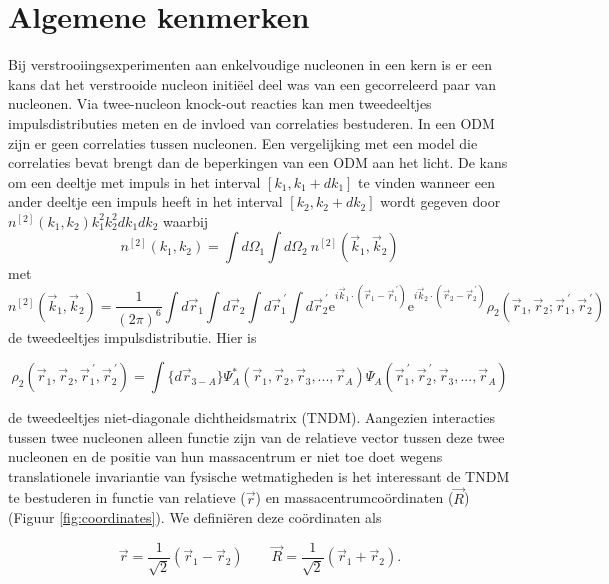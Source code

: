 \documentclass[11pt,twoside]{book}
\begin{document}
\section{Algemene kenmerken}
Bij verstrooiingsexperimenten aan enkelvoudige nucleonen in een kern is er een kans dat het verstrooide nucleon initi\"{e}el deel was van een gecorreleerd paar van nucleonen. Via twee-nucleon knock-out reacties kan men tweedeeltjes impulsdistributies meten \cite{niyazov2004two} en de invloed van correlaties bestuderen. In een ODM zijn er geen correlaties tussen nucleonen. Een vergelijking met een model die correlaties bevat brengt dan de beperkingen van een ODM aan het licht.
De kans om een deeltje met impuls in het interval $[k_1,k_1+dk_1]$ te vinden wanneer een ander deeltje een impuls heeft in het interval $[k_2,k_2+dk_2]$ wordt gegeven door $ n^{[2]}(k_1,k_2)k_1^2k_2^2dk_1dk_2$ waarbij
\begin{equation}
n^{[2]}(k_1,k_2) = \int d\Omega_1 \int d\Omega_2\  n^{[2]}(\vec{k}_1,\vec{k}_2)
\end{equation}
met 
\begin{equation}
n^{[2]}(\vec{k}_1,\vec{k}_2)=\frac{1}{(2\pi)^6}\int d\vec{r}_1 \int d\vec{r}_2 \int  
    						d\vec{r}_1^{\ \prime} \int d\vec{r}_2^{\ \prime} 
    						\mathrm{e}^{i\vec{k}_1\cdot (\vec{r}_1-\vec{r}^{\ \prime}_1)} 
    						\mathrm{e}^{i\vec{k}_2\cdot(\vec{r}_2-\vec{r}^{\ \prime}_2)}
    						\rho_2(\vec{r}_1,\vec{r}_2; \vec{r}_1^{\ \prime},\vec{r}_2^{\ \prime})
\end{equation}
de tweedeeltjes impulsdistributie. Hier is

\begin{equation}
\rho_2(\vec{r}_1,\vec{r}_2, \vec{r}_1^{\ \prime},\vec{r}_2^{\ \prime}) = \int \{d\vec{r}_{3-A}\} \Psi^*_A(\vec{r}_1,\vec{r}_2,\vec{r}_3, ... ,\vec{r}_A)\Psi_A(\vec{r}_1^{\ \prime},\vec{r}_2^{\ \prime},\vec{r}_3, ... ,\vec{r}_A)
\end{equation}

de tweedeeltjes niet-diagonale dichtheidsmatrix (TNDM). Aangezien interacties tussen twee  nucleonen alleen functie zijn van de relatieve vector tussen deze twee nucleonen en de positie van hun massacentrum er niet toe doet wegens translationele invariantie van fysische wetmatigheden is het interessant de TNDM te bestuderen in functie van relatieve ($\vec{r}$) en massacentrumco\"{o}rdinaten ($\vec{R}$) (Figuur \ref{fig:coordinates}). We defini\"{e}ren deze co\"{o}rdinaten als


\begin{equation} \label{eq:rcm_def}
\vec{r}= \frac{1}{\sqrt{2}} \left(\vec{r}_1 - \vec{r}_2\right)  \qquad \vec{R}= \frac{1}{\sqrt{2}} \left(\vec{r}_1 + \vec{r}_2\right).
\end{equation}
\end{document}
